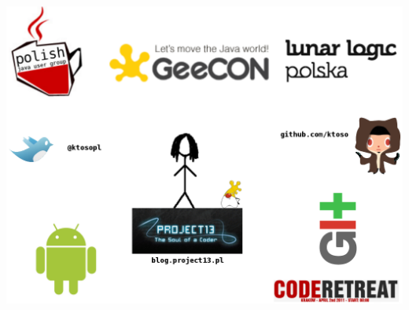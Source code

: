 \begin{frame}
\titlepage
\end{frame}


\begin{frame}
  \centering
  \includegraphics[width=\textwidth,height=\textheight]{images/about_me_slide}
\end{frame}


